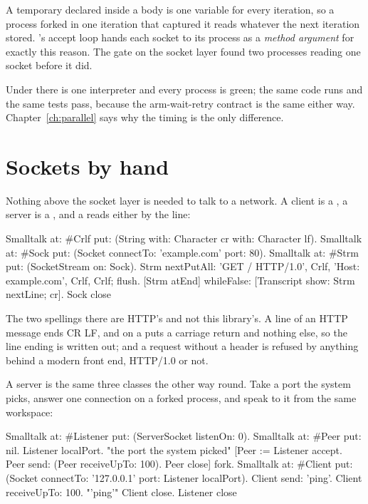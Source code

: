 \begin{stwarn}
A temporary declared inside a  body is one variable for every
iteration, so a process forked in one iteration that captured it reads
whatever the next iteration stored. 's accept loop hands each
socket to its process as a \emph{method argument} for exactly this reason.
The gate on the socket layer found two processes reading one socket before
it did.
\end{stwarn}

Under  there is one interpreter and every process is
green; the same code runs and the same tests pass, because the arm-wait-retry
contract is the same either way. Chapter~\ref{ch:parallel} says why the
timing is the only difference.

\section{Sockets by hand}

Nothing above the socket layer is needed to talk to a network. A client is
a , a server is a , and a 
reads either by the line:

\begin{st}
Smalltalk at: #Crlf put: (String with: Character cr with: Character lf).
Smalltalk at: #Sock put: (Socket connectTo: 'example.com' port: 80).
Smalltalk at: #Strm put: (SocketStream on: Sock).
Strm nextPutAll: 'GET / HTTP/1.0', Crlf, 'Host: example.com', Crlf, Crlf; flush.
[Strm atEnd] whileFalse: [Transcript show: Strm nextLine; cr].
Sock close
\end{st}

The two spellings there are HTTP's and not this library's. A line of an HTTP
message ends CR LF, and  on a  puts a carriage return
and nothing else, so the line ending is written out; and a request without a
 header is refused by anything behind a modern front end, HTTP/1.0
or not.

A server is the same three classes the other way round. Take a port the
system picks, answer one connection on a forked process, and speak to it
from the same workspace:

\begin{st}
Smalltalk at: #Listener put: (ServerSocket listenOn: 0).
Smalltalk at: #Peer put: nil.
Listener localPort.                      "the port the system picked"
[Peer := Listener accept. Peer send: (Peer receiveUpTo: 100). Peer close] fork.
Smalltalk at: #Client put: (Socket connectTo: '127.0.0.1' port: Listener localPort).
Client send: 'ping'.
Client receiveUpTo: 100.                 "'ping'"
Client close.
Listener close
\end{st}

